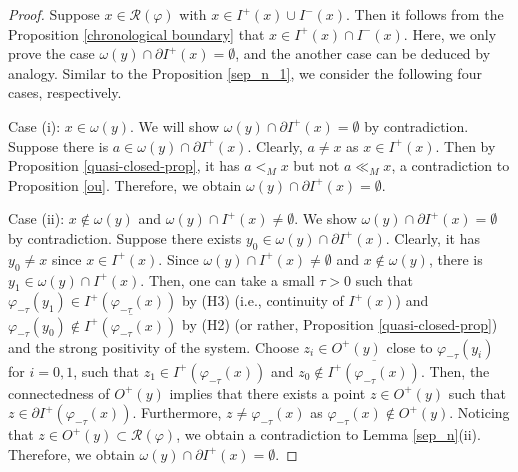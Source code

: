 \documentclass[a4paper,11pt]{article}
\theoremstyle{plain}
\theoremstyle{definition}
\numberwithin{equation}{section}
\begin{document}
    \begin{proof}
		Suppose $x\in \mathcal{R}(\varphi)$ with $x\in I^{+}(x)\cup I^{-}(x)$. Then it follows from the Proposition \ref{chronological boundary} that $x\in I^{+}(x)\cap I^{-}(x)$. Here, we only prove the case $\omega(y)\cap\partial  I^{+}(x)=\emptyset$, and the another case can be deduced by analogy. Similar to the Proposition \ref{sep_n_1}, we consider the following four cases, respectively.

        Case (i): $x\in\omega(y)$. We will show $\omega(y)\cap\partial  I^{+}(x)=\emptyset$ by contradiction. Suppose there is $a\in \omega(y)\cap\partial  I^{+}(x)$. Clearly, $a\neq x$ as $x\in I^{+}(x)$. Then by Proposition \ref{quasi-closed-prop}, it has $a<_M x$ but not $a\ll_M x$, a contradiction to Proposition \ref{ou}. Therefore, we obtain $\omega(y)\cap\partial  I^{+}(x)=\emptyset$.

        Case (ii): $x\notin\omega(y)$ and $\omega(y)\cap  I^{+}(x)\neq\emptyset$.
		We show $\omega(y)\cap\partial  I^{+}(x)=\emptyset$ by contradiction.
		Suppose there exists $y_{0} \in\omega(y)\cap\partial  I^{+}(x)$. Clearly, it has $y_{0}\neq x$ since $x\in I^{+}(x)$. Since $\omega(y)\cap  I^{+}(x)\neq\emptyset$ and $x\notin\omega(y)$, there is $y_{1} \in\omega(y)\cap I^{+}(x)$. Then, one can take a small $\tau>0$ such that $\varphi_{-\tau}(y_{1})\in  I^{+}(\varphi_{-\tau}(x))$ by (H3) (i.e., continuity of $I^{+}(x)$) and $\varphi_{-\tau}(y_{0})\notin  \overline{I^{+}(\varphi_{-\tau}(x))}$ by (H2) (or rather, Proposition \ref{quasi-closed-prop}) and the strong positivity of the system.
		Choose $z_i\in O^{+}(y)$ close to $\varphi_{-\tau}(y_i)$ for $i=0,1$,
		such that $z_1\in  I^{+}(\varphi_{-\tau}(x))$ and $z_0\notin  \overline{I^{+}(\varphi_{-\tau}(x))}$. Then, the connectedness of $O^{+}(y)$ implies that there exists a point $z\in O^{+}(y)$ such that $z\in \partial  I^{+}(\varphi_{-\tau}(x))$. Furthermore, $z\neq\varphi_{-\tau}(x)$ as $\varphi_{-\tau}(x)\notin O^{+}(y)$. Noticing that $z\in O^{+}(y)\subset \mathcal{R}(\varphi)$, we obtain a contradiction to Lemma \ref{sep_n}(ii). Therefore, we obtain
        $\omega(y)\cap\partial  I^{+}(x)=\emptyset$.
        


\end{proof}
\end{document}

